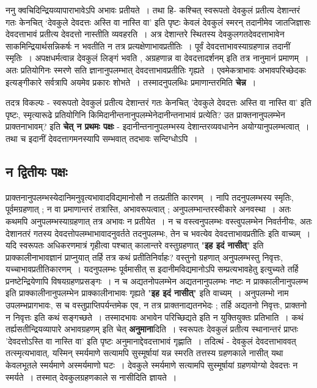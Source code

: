 {ननु क्वचिदिन्द्रियव्यापाराभावेऽपि अभावः प्रतीयते~। तथा हि- कश्चित् स्वरूपतो देवकुलं प्रतीत्य देशान्तरं गतः केनचित् ‘देवकुले देवदत्तः अस्ति वा नास्ति वा’ इति पृष्टः केवलं देवकुलं स्मरन् तदानीमेव जातजिज्ञासः देवदत्ताभावं प्रतीत्य देवदत्तो नास्तीति व्यवहरति~। अत्र देशान्तरे स्थितस्य देवकुलगतदेवदत्ताभावेन साकमिन्द्रियार्थसन्निकर्षः न भवतीति न तत्र प्रत्यक्षेणाभावप्रतीतिः~। पूर्वं देवदत्ताभावस्याग्रहणान्न तदानीं स्मृतिः~। अपक्षधर्मत्वान्न देवकुलं लिङ्गं भवति , अग्रहणान्न वा देवदत्तादर्शनम् इति तत्र नानुमानं प्रमाणम्~। अतः प्रतियोगिनः स्मरणे सति ज्ञानानुपलम्भात् देवदत्ताभावप्रतीतिः गृह्यते~। एवमेकत्राभावः अभावपरिच्छेदकः इत्यङ्गीकारे सर्वत्रापि अयमेव प्रकारः शोभते~। तस्मादनुपलब्धिः प्रमाणान्तरमिति \textbf{चेन्न}~। 

तदत्र विकल्पः - स्वरूपतो देवकुलं प्रतीत्य देशान्तरं गतः केनचित् 'देवकुले देवदत्तः अस्ति वा नास्ति वा' इति पृष्टः, स्मृत्यारूढे प्रतियोगिनि किमिदानीन्तनानुपलम्भेनेदानीन्तनाभावं प्रत्येति? उत प्राक्तनानुपलम्भेन प्राक्तनाभावम्? इति \textbf{चेत् न प्रथमः पक्षः} - इदानीन्तनानुपलम्भस्य देशान्तरव्यवधानेन अयोग्यानुपलम्भत्वात्~। तथा च इदानीं देवदत्तागमनस्यापि सम्भवात् तदभावः सन्दिग्धोऽपि~। 

\subsection*{न द्वितीयः पक्षः} 

प्राक्तनानुपलम्भस्येदानिमनुवृत्यभावादविद्यमानोसौ न तत्प्रतीति कारणम्~। नापि तदनुपलम्भस्य स्मृतिः, पूर्वमग्रहणात् ; न वा प्रमाणान्तरं तत्रास्ति, अभावरूपत्वात् ; अनुपलम्भान्तरस्वीकारे अनवस्था~। अतः कथमपि अनुपलम्भस्याग्रहणात् तत्र अभावः न प्रतीयेत~। न च वस्त्वनुपलम्भः वस्त्वुपलम्भेन निवर्तनीयः, अतः देशानतरं गतस्य देवदत्तोपलम्भाभावादनुवर्तते तदनुपलम्भः, तेन च भवत्येव देवदत्ताभावप्रतीतिः इति वाच्यम्~। यदि स्वरूपतः अधिकरणमात्रं गृहीत्वा पश्चात् कालान्तरे वस्तुग्रहणात् "\textbf{इह इदं नासीत्}" इति प्राक्कालीनाभावज्ञानं प्राप्नुयात् तर्हि तत्र कथं प्रतीतिनिर्वाहः? वस्तुनो ग्रहणात् अनुपलम्भस्तु निवृत्तः, यच्चाभावप्रतीतिकारणम्~। यदनुपलम्भः पूर्वमासीत् स इदानीमविद्यमानोऽपि सम्प्रत्यभावहेतु इत्युच्यते तर्हि प्रनष्टेन्द्रियेणापि विषयग्रहणप्रसङ्गः~। न च अद्यतनोपलम्भेन अद्यतनानुपलम्भः नष्टः न प्राक्कालीनानुपलम्भ इति प्राक्कालीनानुपलम्भेन प्राक्कालीनाभावः गृह्यते "\textbf{इह इदं नासीत्}" इति वाच्यम्~। अनुपलम्भो नाम उपलम्भप्रागभावः, स च वस्तुप्राप्तिपर्यन्तमेक एव, न तत्र प्राक्तनाद्यतनभेदः ; तर्हि अद्यतनो निवृत्तः, प्राक्तनो न निवृत्तः इति कथं सङ्गच्छते~। तस्मादभावः अभावेन परिच्छिद्यते इति न युक्तियुक्तः प्रतिभाति~। कथं तर्ह्यसतीन्द्रियव्यापारे अभावग्रहणम् इति चेत् \textbf{अनुमाना}दिति~। स्वरूपतः देवकुलं प्रतीत्य स्थानान्तरं प्राप्तः 'देवदत्तोऽस्ति वा नास्ति वा' इति पृष्टः अनुमानाद्देवदत्ताभावं गृह्णाति~। तदित्थं - देवकुलं देवदत्ताभाववत् तत्स्मृत्यभावात्, यस्मिन् स्मर्यमाणे सत्यामपि सुस्मूर्षायां यन्न स्मरति तत्तस्य ग्रहणकाले नासीत् यथा केवलभूतले स्मर्यमाणे अस्मर्यमाणो घटः~। देवकुले स्मर्यमाणे सत्यामपि सुस्मूर्षायां ग्रहणयोग्यो देवदत्तः न स्मर्यते~। तस्मात् देवकुलग्रहणकाले स नासीदिति ज्ञायते~। 

}
